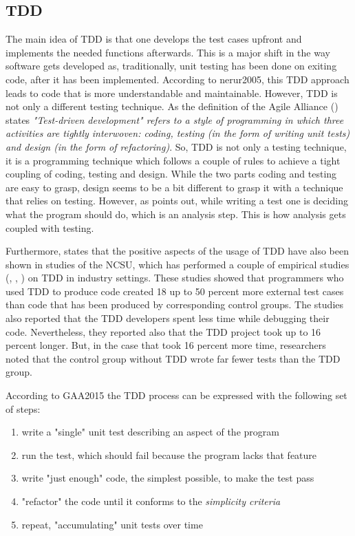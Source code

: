 \subsection{TDD}
The main idea of \ac{TDD} is that one develops the test cases upfront and implements the needed functions afterwards. This is a major shift in the way software gets developed as, traditionally, unit testing has been done on exiting code, after it has been implemented. According to \ac{nerur2005}, this \ac{TDD} approach leads to code that is more understandable and maintainable. However, \ac{TDD} is not only a different testing technique. As the definition of the Agile Alliance (\cite{GAA2015}) states \textit{"Test-driven development" refers to a style of programming in which three activities are tightly interwoven: coding, testing (in the form of writing unit tests) and design (in the form of refactoring)}. So, \ac{TDD} is not only a testing technique, it is a programming technique which follows a couple of rules to  achieve a tight coupling of coding, testing and design. While the two parts coding and testing are easy to grasp, design seems to be a bit different to grasp it with a technique that relies on testing. However, as \cite{Janzen2005} points out, while writing a test one is deciding what the program should do, which is an analysis step. This is how analysis gets coupled with testing.

Furthermore, \cite{Janzen2005} states that the positive aspects of the usage of \ac{TDD} have also been shown in studies of the \ac{NCSU}, which has performed a couple of empirical studies (\cite{George2004}, \cite{max03}, \cite{Williams2003}) on TDD in industry settings.
These studies showed that programmers who used \ac{TDD} to produce code created 18 up to 50 percent more external test cases than code that has been produced by corresponding control groups. The studies also reported that the \ac{TDD} developers spent less time while debugging their code. Nevertheless, they reported also that the \ac{TDD} project took up to 16 percent longer. But, in the case that took 16 percent more time, researchers noted that the control group without \ac{TDD} wrote far fewer tests than the \ac{TDD} group. 

According to \ac{GAA2015} the \ac{TDD} process can be expressed with the following set of steps:

\begin{enumerate}
  	\item write a "single" unit test describing an aspect of the program
  	\item run the test, which should fail because the program lacks that feature
  	\item write "just enough" code, the simplest possible, to make the test pass
	\item "refactor" the code until it conforms to the \textit{simplicity criteria}
	\item repeat, "accumulating" unit tests over time
\end{enumerate}

